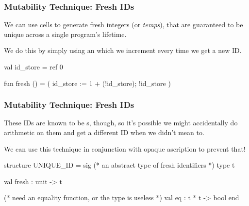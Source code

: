 \documentclass[aspectratio=169]{beamer}
\begin{document}
\begin{frame}[fragile]
  \frametitle{Mutability Technique: Fresh IDs}

  We can use  cells to generate fresh integers (or \textit{temps}), that
  are guaranteed to be unique across a single program's lifetime.

  \pause
  \vspace{\fill}


  \pause
  \vspace{\fill}

  We do this by simply using an  which we increment every time
  we get a new ID.

  \pause
  \vspace{\fill}

  \begin{codeblock}
    val id_store = ref 0

    fun fresh () =
      ( id_store := 1 + (!id_store);
        !id_store
      )
  \end{codeblock}
\end{frame}

\begin{frame}[fragile]
  \frametitle{Mutability Technique: Fresh IDs}

  These IDs are known to be s, though, so it's possible we might
  accidentally do arithmetic on them and get a different ID when we didn't
  mean to.

  \pause
  \vspace{\fill}

  We can use this technique in conjunction with opaque ascription to prevent
  that!

  \pause
  \vspace{\fill}

  \begin{codeblock}
    structure UNIQUE_ID =
      sig
        (* an abstract type of fresh identifiers *)
        type t

        val fresh : unit -> t

        (* need an equality function, or the type is useless *)
        val eq : t * t -> bool
      end
  \end{codeblock}
\end{frame}
\end{document}
